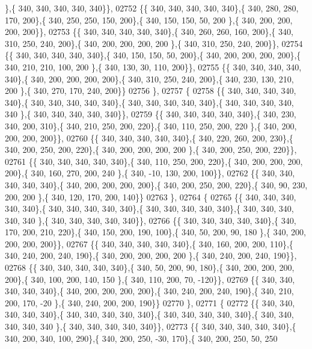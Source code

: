 \begin{DoxyCode}
      \},\{ 340, 340, 340, 340, 340\}\},
02752 \{\{ 340, 340, 340, 340, 340\},\{ 340, 280, 280, 170, 200\},\{ 340, 250, 250, 150, 200\},\{ 340, 150, 150,  50, 200
      \},\{ 340, 200, 200, 200, 200\}\},
02753 \{\{ 340, 340, 340, 340, 340\},\{ 340, 260, 260, 160, 200\},\{ 340, 310, 250, 240, 200\},\{ 340, 200, 200, 200, 200
      \},\{ 340, 310, 250, 240, 200\}\},
02754 \{\{ 340, 340, 340, 340, 340\},\{ 340, 150, 150,  50, 200\},\{ 340, 200, 200, 200, 200\},\{ 340, 210, 210, 100, 200
      \},\{ 340, 130,  30, 110, 200\}\},
02755 \{\{ 340, 340, 340, 340, 340\},\{ 340, 200, 200, 200, 200\},\{ 340, 310, 250, 240, 200\},\{ 340, 230, 130, 210, 200
      \},\{ 340, 270, 170, 240, 200\}\}
02756 \},
02757 \{
02758 \{\{ 340, 340, 340, 340, 340\},\{ 340, 340, 340, 340, 340\},\{ 340, 340, 340, 340, 340\},\{ 340, 340, 340, 340, 340
      \},\{ 340, 340, 340, 340, 340\}\},
02759 \{\{ 340, 340, 340, 340, 340\},\{ 340, 230, 340, 200, 310\},\{ 340, 210, 250, 200, 220\},\{ 340, 110, 250, 200, 220
      \},\{ 340, 200, 200, 200, 200\}\},
02760 \{\{ 340, 340, 340, 340, 340\},\{ 340, 220, 260, 200, 230\},\{ 340, 200, 250, 200, 220\},\{ 340, 200, 200, 200, 200
      \},\{ 340, 200, 250, 200, 220\}\},
02761 \{\{ 340, 340, 340, 340, 340\},\{ 340, 110, 250, 200, 220\},\{ 340, 200, 200, 200, 200\},\{ 340, 160, 270, 200, 240
      \},\{ 340, -10, 130, 200, 100\}\},
02762 \{\{ 340, 340, 340, 340, 340\},\{ 340, 200, 200, 200, 200\},\{ 340, 200, 250, 200, 220\},\{ 340,  90, 230, 200, 200
      \},\{ 340, 120, 170, 200, 140\}\}
02763 \},
02764 \{
02765 \{\{ 340, 340, 340, 340, 340\},\{ 340, 340, 340, 340, 340\},\{ 340, 340, 340, 340, 340\},\{ 340, 340, 340, 340, 340
      \},\{ 340, 340, 340, 340, 340\}\},
02766 \{\{ 340, 340, 340, 340, 340\},\{ 340, 170, 200, 210, 220\},\{ 340, 150, 200, 190, 100\},\{ 340,  50, 200,  90, 180
      \},\{ 340, 200, 200, 200, 200\}\},
02767 \{\{ 340, 340, 340, 340, 340\},\{ 340, 160, 200, 200, 110\},\{ 340, 240, 200, 240, 190\},\{ 340, 200, 200, 200, 200
      \},\{ 340, 240, 200, 240, 190\}\},
02768 \{\{ 340, 340, 340, 340, 340\},\{ 340,  50, 200,  90, 180\},\{ 340, 200, 200, 200, 200\},\{ 340, 100, 200, 140, 150
      \},\{ 340, 110, 200,  70, -120\}\},
02769 \{\{ 340, 340, 340, 340, 340\},\{ 340, 200, 200, 200, 200\},\{ 340, 240, 200, 240, 190\},\{ 340, 210, 200, 170, -20
      \},\{ 340, 240, 200, 200, 190\}\}
02770 \},
02771 \{
02772 \{\{ 340, 340, 340, 340, 340\},\{ 340, 340, 340, 340, 340\},\{ 340, 340, 340, 340, 340\},\{ 340, 340, 340, 340, 340
      \},\{ 340, 340, 340, 340, 340\}\},
02773 \{\{ 340, 340, 340, 340, 340\},\{ 340, 200, 340, 100, 290\},\{ 340, 200, 250, -30, 170\},\{ 340, 200, 250,  50, 250

\end{DoxyCode}

